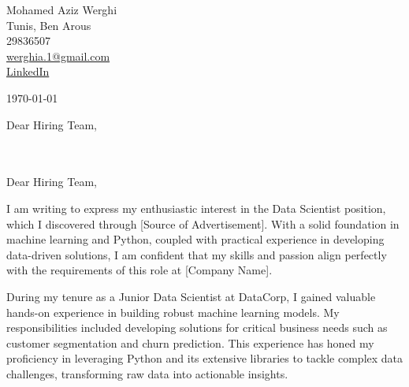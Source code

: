 \documentclass[10pt]{article}
\begin{document}
\begin{flushleft}
Mohamed Aziz Werghi \\
Tunis, Ben Arous \\
29836507 \\
\href{mailto:werghia.1@gmail.com}{werghia.1@gmail.com} \\
\href{https://linkedin.com/in/azizwerghi}{LinkedIn}
\end{flushleft}

\vspace{1em} %

\today

\vspace{1em} %

\begin{flushleft}
Dear Hiring Team, \\
[Hiring Manager Title] \\
[Company Name] \\
[Company Address]
\end{flushleft}

\vspace{1em} %

Dear Hiring Team,

\vspace{1em} %

I am writing to express my enthusiastic interest in the Data Scientist position, which I discovered through [Source of Advertisement]. With a solid foundation in machine learning and Python, coupled with practical experience in developing data-driven solutions, I am confident that my skills and passion align perfectly with the requirements of this role at [Company Name].

\vspace{1em} %

During my tenure as a Junior Data Scientist at DataCorp, I gained valuable hands-on experience in building robust machine learning models. My responsibilities included developing solutions for critical business needs such as customer segmentation and churn prediction. This experience has honed my proficiency in leveraging Python and its extensive libraries to tackle complex data challenges, transforming raw data into actionable insights.

\vspace{1em} %
\end{document}
